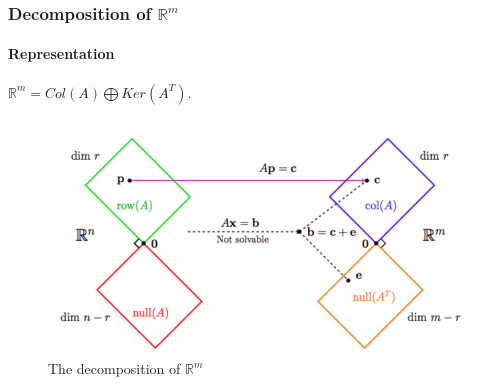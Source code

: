 \documentclass[11pt]{article}
\newcommand{\re}[1]{\mathbb{R}^#1}
\begin{document}
	\subsubsection{Decomposition of $\re{m}$}
	\paragraph{Representation} $\re{m} = Col(A) \bigoplus Ker(A^T)$.
	\begin{figure}[h]
		\centering
		\includegraphics[width = \linewidth]{223_pic/decomposition_rm}
		\caption{The decomposition of $\re{m}$}
	\end{figure}
\end{document}
